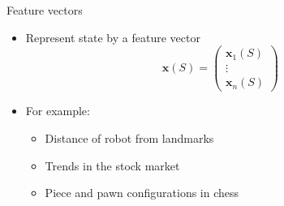 \bgroup
\begin{frame}{Feature vectors}
\begin{itemize}
\item Represent state by a feature vector
\begin{equation*}
\textbf{x}(S) = \left(\begin{array}{c}
\textbf{x}_1(S)\\
\vdots\\
\textbf{x}_n(S)
\end{array}
\right)
\end{equation*}
\item For example:
\begin{itemize}
\item Distance of robot from landmarks
\item Trends in the stock market
\item Piece and pawn configurations in chess
\end{itemize}
\end{itemize}
\end{frame}
\egroup